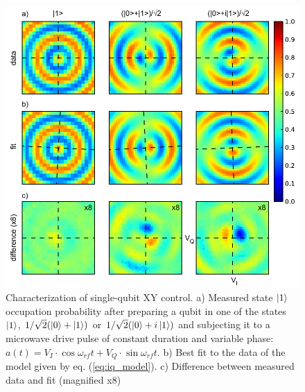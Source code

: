 \begin{figure}[ht!]
	\centering
		\includegraphics[width=\textwidth]{"./data/ct5/2010_12_01 - iq tomography/iq_tomography_analysis"}
	\caption{Characterization of single-qubit XY control. a) Measured state $\left| 1 \right>$ occupation probability after preparing a qubit in one of the states $\left| 1 \right>$, $1/\sqrt{2}(\left| 0 \right>+\left| 1 \right>)$ or $1/\sqrt{2}(\left| 0 \right>+i\left| 1 \right>)$ and subjecting it to a microwave drive pulse of constant duration and variable phase: $a(t) = V_I\cdot\cos{\omega_{rf}t}+V_Q\cdot\sin{\omega_{rf}t}$.  b) Best fit to the data of  the model given by eq. (\ref{eq:iq_model}). c) Difference between measured data and fit (magnified x8)}
	\label{fig:single_qubit_iq_control}
\end{figure}

